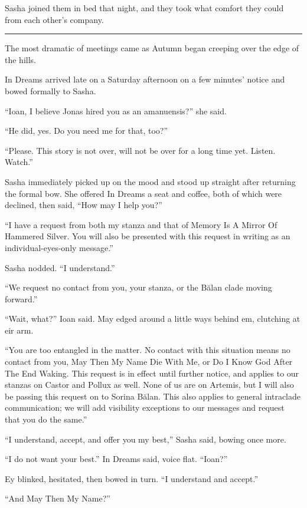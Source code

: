 Sasha joined them in bed that night, and they took what comfort they could from each other's company.

\begin{center}\rule{0.5\linewidth}{0.5pt}\end{center}

The most dramatic of meetings came as Autumn began creeping over the edge of the hills.

In Dreams arrived late on a Saturday afternoon on a few minutes' notice and bowed formally to Sasha.

``Ioan, I believe Jonas hired you as an amanuensis?'' she said.

``He did, yes. Do you need me for that, too?''

``Please. This story is not over, will not be over for a long time yet. Listen. Watch.''

Sasha immediately picked up on the mood and stood up straight after returning the formal bow. She offered In Dreams a seat and coffee, both of which were declined, then said, ``How may I help you?''

``I have a request from both my stanza and that of Memory Is A Mirror Of Hammered Silver. You will also be presented with this request in writing as an individual-eyes-only message.''

Sasha nodded. ``I understand.''

``We request no contact from you, your stanza, or the Bălan clade moving forward.''

``Wait, what?'' Ioan said. May edged around a little ways behind em, clutching at eir arm.

``You are too entangled in the matter. No contact with this situation means no contact from you, May Then My Name Die With Me, or Do I Know God After The End Waking. This request is in effect until further notice, and applies to our stanzas on Castor and Pollux as well. None of us are on Artemis, but I will also be passing this request on to Sorina Bălan. This also applies to general intraclade communication; we will add visibility exceptions to our messages and request that you do the same.''

``I understand, accept, and offer you my best,'' Sasha said, bowing once more.

``I do not want your best.'' In Dreams said, voice flat. ``Ioan?''

Ey blinked, hesitated, then bowed in turn. ``I understand and accept.''

``And May Then My Name?''

